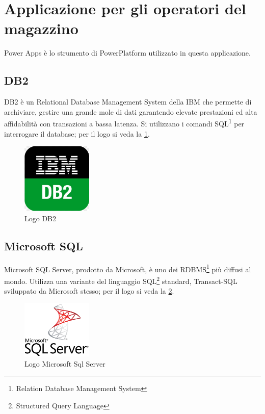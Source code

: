 \section{Applicazione per gli operatori del magazzino}
Power Apps è lo strumento di PowerPlatform utilizzato in questa applicazione.
\subsection{DB2}
DB2 è un Relational Database Management System della IBM che permette di archiviare, gestire una grande mole di dati garantendo elevate prestazioni ed alta affidabilità con transazioni a bassa latenza.
Si utilizzano i comandi SQL\textsuperscript{1} per interrogare il database; per il logo si veda la \figurename \space \ref*{fig:DB2}.
\begin{figure}[H]
    \centering\includegraphics[width=0.3\textwidth, height=0.3\textheight,keepaspectratio]{immagini/logo-ibm-db2.jpg}
    \caption{Logo DB2}
    \label{fig:DB2}
\end{figure}

\subsection{Microsoft SQL}
Microsoft SQL Server, prodotto da Microsoft, è uno dei RDBMS\footnote{Relation Database Management System} più diffusi al mondo. 
Utilizza una variante del linguaggio SQL\footnote{Structured Query Language} standard, Transact-SQL sviluppato da Microsoft stesso; per il logo si veda la \figurename \space \ref*{fig:M-SQL}.
\begin{figure}[H]
    \centering\includegraphics[width=0.3\textwidth, height=0.3\textheight,keepaspectratio]{immagini/logo-SqlServer.png}
    \caption{Logo Microsoft Sql Server}
    \label{fig:M-SQL}
\end{figure}


